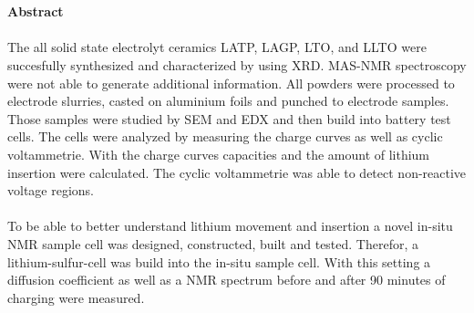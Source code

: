 \documentclass[a4paper, 11pt, headsepline,footsepline,twoside,abstract]{scrbook}
\begin{document}
\\\\
\textbf{\Large{Abstract}}
\\\\
The all solid state electrolyt ceramics LATP, LAGP, LTO, and LLTO were succesfully synthesized and characterized by using XRD. MAS-NMR spectroscopy were not able to generate additional information. All powders were processed to electrode slurries, casted on aluminium foils and punched to electrode samples. Those samples were studied by SEM and EDX and then build into battery test cells. The cells were analyzed by measuring the charge curves as well as cyclic voltammetrie. With the charge curves capacities and the amount of lithium insertion were calculated. The cyclic voltammetrie was able to detect non-reactive voltage regions.
\\\\
To be able to better understand lithium movement and insertion a novel in-situ NMR sample cell was designed, constructed, built and tested. Therefor, a lithium-sulfur-cell was build into the in-situ sample cell. With this setting a diffusion coefficient as well as a NMR spectrum before and after 90 minutes of charging were measured. 
\pagestyle{toc}
\renewcommand*{\chapterpagestyle}{toc} %
\tableofcontents
{} 
\newpage
\cleardoubleemptypage
\pagestyle{normal}
\renewcommand*{\chapterpagestyle}{plain}
\setcounter{page}{1}
\end{document}
